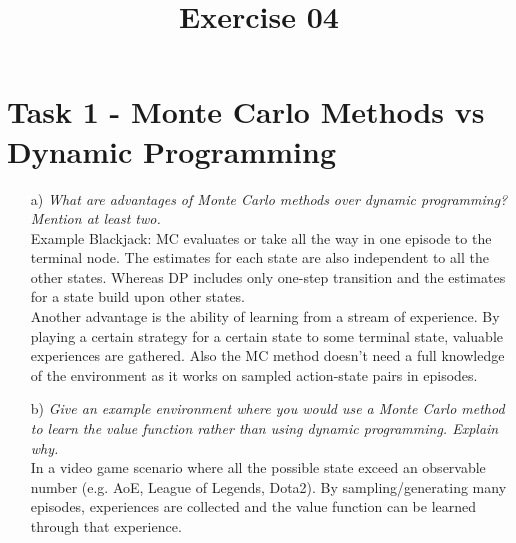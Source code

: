 \documentclass[a4paper]{article}
\date{}
\author{}
\title{\textbf{Exercise 04}}
\begin{document}
	\maketitle 
	\thispagestyle{fancy}
	
    \section*{Task 1 - Monte Carlo Methods vs Dynamic Programming}
    \begin{itemize}
    	\item[a)] \textit{What are advantages of Monte Carlo methods over dynamic programming? Mention at least two.}\\
    	
    	Example Blackjack: MC evaluates or take all the way in one episode to the terminal node. The estimates for each state are also independent to all the other states. Whereas DP includes only one-step transition and the estimates for a state build upon other states.\\
    	Another advantage is the ability of learning from a stream of experience. By playing a certain strategy for a certain state to some terminal state, valuable experiences are gathered. 
    	Also the MC method doesn't need a full knowledge of the environment as it works on sampled action-state pairs in episodes.
    	
    	\item[b)]\textit{Give an example environment where you would use a Monte Carlo method to learn the value function rather than
    		using dynamic programming. Explain why.}\\
    	
    	In a video game scenario where all the possible state exceed an observable number (e.g. AoE, League of Legends, Dota2). By sampling/generating many episodes, experiences are collected and the value function can be learned through that experience.
    \end{itemize}
\end{document}
